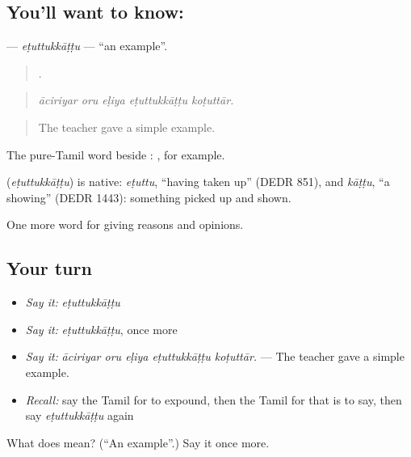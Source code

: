 \subsection*{You'll want to know: }
\textbf{} — \emph{eṭuttukkāṭṭu} — \textquotedblleft{}an example\textquotedblright{}.

\begin{quote}
    .
\end{quote}

\begin{quote}
\emph{āciriyar oru eḷiya eṭuttukkāṭṭu koṭuttār.}
\end{quote}

\begin{quote}
The teacher gave a simple example.
\end{quote}

The pure-Tamil word beside : , for example.

\begin{cousinweb}
\textbf{} (\emph{eṭuttukkāṭṭu}) is native: \emph{eṭuttu}, \textquotedblleft{}having taken up\textquotedblright{} (DEDR 851), and \emph{kāṭṭu}, \textquotedblleft{}a showing\textquotedblright{} (DEDR 1443): something picked up and shown.
\end{cousinweb}

\begin{grammarlens}[title={What you've built}]
One more word for giving reasons and opinions.
\end{grammarlens}

\subsection*{Your turn}
\begin{itemize}
\raggedright
  \item \emph{Say it:} \emph{eṭuttukkāṭṭu}
  \item \emph{Say it:} \emph{eṭuttukkāṭṭu}, once more
  \item \emph{Say it:} \emph{āciriyar oru eḷiya eṭuttukkāṭṭu koṭuttār.} — The teacher gave a simple example.
  \item \emph{Recall:} say the Tamil for to expound, then the Tamil for that is to say, then say \emph{eṭuttukkāṭṭu} again
\end{itemize}

\begin{tcolorbox}[breakable,colback=teal!4,colframe=teal!35!black,title={Before you move on}]
What does  mean? (\textquotedblleft{}An example\textquotedblright{}.) Say it once more.
\end{tcolorbox}

